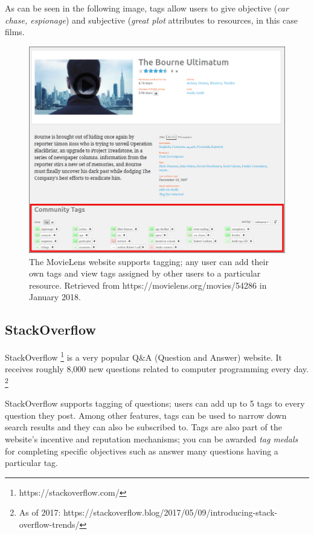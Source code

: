 As can be seen in the following image, tags allow users to give objective (\textit{car chase, espionage}) and subjective (\textit{great plot} attributes to resources, in this case films.

\begin{figure}[!h]
    \centering
    \includegraphics[width=\textwidth]{chapters/02_social_tagging/images/movielens.png}
    \caption{The MovieLens website supports tagging; any user can add their own tags and view tags assigned by other users to a particular resource. Retrieved from https://movielens.org/movies/54286 in January 2018.}
    \label{fig:movielens}
\end{figure}

\subsection{StackOverflow}

StackOverflow \footnote{https://stackoverflow.com/} is a very popular Q\&A (Question and Answer) website. It receives roughly 8,000 new questions related to computer programming every day. \footnote{As of 2017: https://stackoverflow.blog/2017/05/09/introducing-stack-overflow-trends/}

StackOverflow supports tagging of questions; users can add up to 5 tags to every question they post. Among other features, tags can be used to narrow down search results and they can also be subscribed to. Tags are also part of the website's incentive and reputation mechanisms; you can be awarded \textit{tag medals} for completing specific objectives such as answer many questions having a particular tag.

